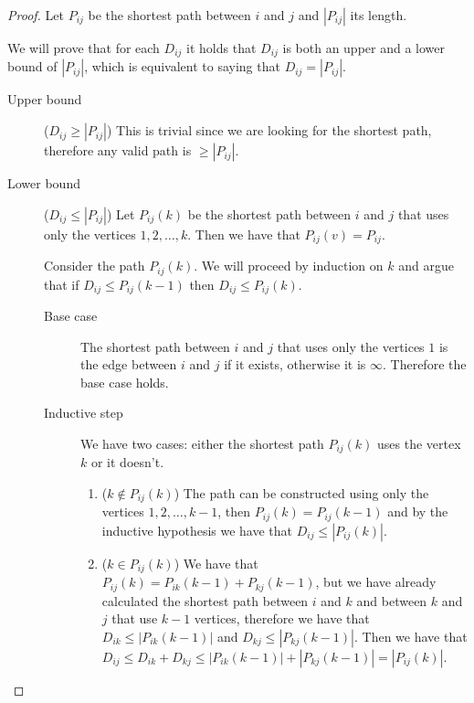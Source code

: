 \documentclass[12pt]{extarticle}
\begin{document}
\begin{proof}
    Let $P_{ij}$ be the shortest path between $i$ and $j$ and $|P_{ij}|$ its length.

    We will prove that for each $D_{ij}$ it holds that $D_{ij}$ is both an upper and a lower bound of $|P_{ij}|$, which is equivalent to saying that $D_{ij} = |P_{ij}|$.
    \begin{description}
        \item[Upper bound] ($D_{ij} \geq |P_{ij}|$)
            This is trivial since we are looking for the shortest path, therefore any valid path is $\geq |P_{ij}|$.
        \item[Lower bound] ($D_{ij} \leq |P_{ij}|$)
            Let $P_{ij}(k)$ be the shortest path between $i$ and $j$ that uses only the vertices $1, 2, \ldots, k$.
            Then we have that $P_{ij}(v) = P_{ij}$.

            Consider the path $P_{ij}(k)$.
            We will proceed by induction on $k$ and argue that if $D_{ij} \leq P_{ij}(k-1)$ then $D_{ij} \leq P_{ij}(k)$.

            \begin{description}
                \item[Base case] The shortest path between $i$ and $j$ that uses only the vertices $1$ is the edge between $i$ and $j$ if it exists, otherwise it is $\infty$. Therefore the base case holds.
                \item[Inductive step]
                    We have two cases: either the shortest path $P_{ij}(k)$ uses the vertex $k$ or it doesn't.

                    \begin{enumerate}[label=\roman*.]
                        \item ($k \notin P_{ij}(k)$)
                              The path can be constructed using only the vertices $1, 2, \ldots, k-1$, then $P_{ij}(k) = P_{ij}(k-1)$ and by the inductive hypothesis we have that $D_{ij} \leq |P_{ij}(k)|$.

                        \item ($k \in P_{ij}(k)$)
                              We have that $P_{ij}(k) = P_{ik}(k-1) + P_{kj}(k-1)$, but we have already calculated the shortest path between $i$ and $k$ and between $k$ and $j$ that use $k-1$ vertices, therefore we have that $D_{ik} \leq |P_{ik}(k-1)|$ and $D_{kj} \leq |P_{kj}(k-1)|$.
                              Then we have that $D_{ij} \leq D_{ik} + D_{kj} \leq |P_{ik}(k-1)| + |P_{kj}(k-1)| = |P_{ij}(k)|$.


\end{enumerate}
\end{description}
\end{description}
\end{proof}
\end{document}
